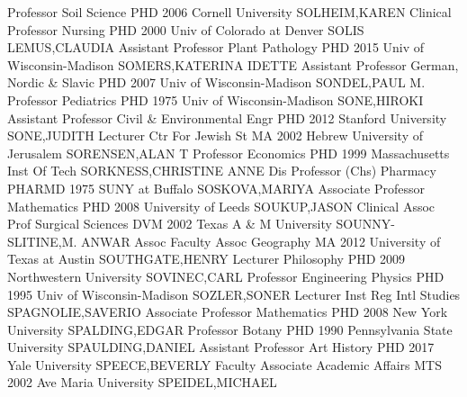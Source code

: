 \documentclass[
]{article}
\begin{document}
\textbar Professor \textbar Soil Science \textbar PHD 2006 Cornell
University \textbar{}  \textbar SOLHEIM,KAREN
\textbar Clinical Professor \textbar Nursing \textbar PHD 2000 Univ of
Colorado at Denver \textbar{}  \textbar SOLIS LEMUS,CLAUDIA
\textbar Assistant Professor \textbar Plant Pathology \textbar PHD 2015
Univ of Wisconsin-Madison \textbar{} 
\textbar SOMERS,KATERINA IDETTE \textbar Assistant Professor
\textbar German, Nordic \& Slavic \textbar PHD 2007 Univ of
Wisconsin-Madison \textbar{}  \textbar SONDEL,PAUL M.
\textbar Professor \textbar Pediatrics \textbar PHD 1975 Univ of
Wisconsin-Madison \textbar{}  \textbar SONE,HIROKI
\textbar Assistant Professor \textbar Civil \& Environmental Engr
\textbar PHD 2012 Stanford University \textbar{} 
\textbar SONE,JUDITH \textbar Lecturer \textbar Ctr For Jewish St
\textbar MA 2002 Hebrew University of Jerusalem \textbar{} 
\textbar SORENSEN,ALAN T \textbar Professor \textbar Economics
\textbar PHD 1999 Massachusetts Inst Of Tech \textbar{} 
\textbar SORKNESS,CHRISTINE ANNE \textbar Dis Professor (Chs)
\textbar Pharmacy \textbar PHARMD 1975 SUNY at Buffalo \textbar{}
 \textbar SOSKOVA,MARIYA \textbar Associate Professor
\textbar Mathematics \textbar PHD 2008 University of Leeds \textbar{}
 \textbar SOUKUP,JASON \textbar Clinical Assoc Prof
\textbar Surgical Sciences \textbar DVM 2002 Texas A \& M University
\textbar{}  \textbar SOUNNY-SLITINE,M. ANWAR \textbar Assoc
Faculty Assoc \textbar Geography \textbar MA 2012 University of Texas at
Austin \textbar{}  \textbar SOUTHGATE,HENRY
\textbar Lecturer \textbar Philosophy \textbar PHD 2009 Northwestern
University \textbar{}  \textbar SOVINEC,CARL
\textbar Professor \textbar Engineering Physics \textbar PHD 1995 Univ
of Wisconsin-Madison \textbar{}  \textbar SOZLER,SONER
\textbar Lecturer \textbar Inst Reg Intl Studies
\textbar SPAGNOLIE,SAVERIO \textbar{}  \textbar Associate
Professor \textbar Mathematics \textbar PHD 2008 New York University
\textbar SPALDING,EDGAR \textbar{}  \textbar Professor
\textbar Botany \textbar PHD 1990 Pennsylvania State University
\textbar SPAULDING,DANIEL \textbar{}  \textbar Assistant
Professor \textbar Art History \textbar PHD 2017 Yale University
\textbar SPEECE,BEVERLY \textbar{}  \textbar Faculty
Associate \textbar Academic Affairs \textbar MTS 2002 Ave Maria
University \textbar SPEIDEL,MICHAEL \textbar{} 
\end{document}
